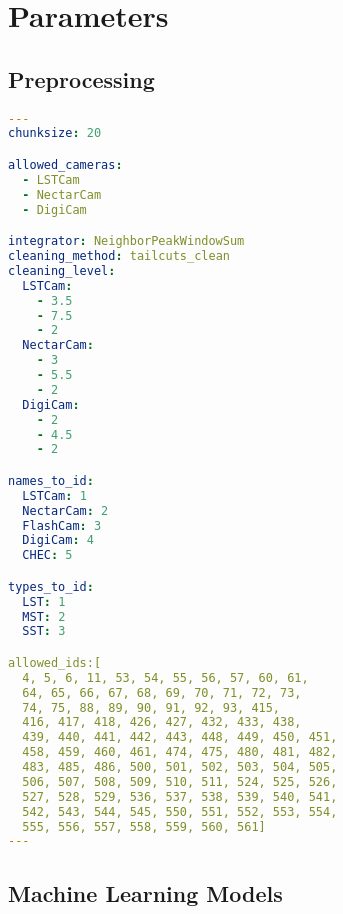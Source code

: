\chapter{Parameters}
\label{sec:app_params}

\section{Preprocessing}

\begin{lstlisting}[language=yaml]
---
chunksize: 20

allowed_cameras:
  - LSTCam
  - NectarCam
  - DigiCam

integrator: NeighborPeakWindowSum
cleaning_method: tailcuts_clean
cleaning_level:
  LSTCam:
    - 3.5
    - 7.5
    - 2
  NectarCam:
    - 3
    - 5.5
    - 2
  DigiCam:
    - 2
    - 4.5
    - 2

names_to_id:
  LSTCam: 1
  NectarCam: 2
  FlashCam: 3
  DigiCam: 4
  CHEC: 5

types_to_id:
  LST: 1
  MST: 2
  SST: 3

allowed_ids:[
  4, 5, 6, 11, 53, 54, 55, 56, 57, 60, 61,
  64, 65, 66, 67, 68, 69, 70, 71, 72, 73, 
  74, 75, 88, 89, 90, 91, 92, 93, 415, 
  416, 417, 418, 426, 427, 432, 433, 438,
  439, 440, 441, 442, 443, 448, 449, 450, 451,
  458, 459, 460, 461, 474, 475, 480, 481, 482,
  483, 485, 486, 500, 501, 502, 503, 504, 505, 
  506, 507, 508, 509, 510, 511, 524, 525, 526, 
  527, 528, 529, 536, 537, 538, 539, 540, 541, 
  542, 543, 544, 545, 550, 551, 552, 553, 554,
  555, 556, 557, 558, 559, 560, 561]
---
\end{lstlisting}

\section{Machine Learning Models}

